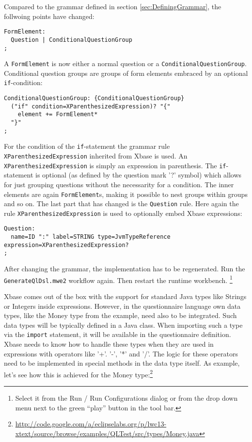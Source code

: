Compared to the grammar defined in section \ref{sec:DefiningGrammar}, the follwoing points have changed:


\begin{lstlisting}[language=Xtext]
FormElement:
  Question | ConditionalQuestionGroup
;
\end{lstlisting}

A \texttt{FormElement} is now either a normal question or a \texttt{ConditionalQuestionGroup}. Conditional
question groups are groups of form elements embraced by an optional \texttt{if}-condition:

\begin{lstlisting}[language=Xtext]
ConditionalQuestionGroup: {ConditionalQuestionGroup}
  ("if" condition=XParenthesizedExpression)? "{"
    element += FormElement*
  "}"
;
\end{lstlisting}

For the condition of the \texttt{if}-statement the grammar rule \texttt{XParenthesizedExpression} 
inherited from Xbase is used. An \texttt{XParenthesizedExpression} is simply an expression in parenthesis.
The \texttt{if}-statement is optional (as defined by the question mark '?' symbol) which allows for just
grouping questions without the necessarity for a condition. The inner elements are again \texttt{FormElement}s,
making it possible to nest groups within groups and so on. The last part that has changed is the \texttt{Question}
rule. Here again the rule \texttt{XParenthesizedExpression} is used to optionally embed Xbase expressions:

\begin{lstlisting}[language=Xtext]
Question:
  name=ID ":" label=STRING type=JvmTypeReference expression=XParenthesizedExpression?
;
\end{lstlisting}

After changing the grammar, the implementation has to be regenerated. Run the
\newline\texttt{GenerateQlDsl.mwe2} workflow again. Then restart the runtime
workbench.
\footnote{Select it from the Run / Run Configurations dialog or from the drop
down menu next to the green ``play'' button in the tool bar.}

Xbase comes out of the box with the support for standard Java types like Strings or Integers inside expressions.
However, in the questionnaire language own data types, like the Money type from the example, need also to be
integrated. Such data types will be typically defined in a Java class. When importing such a type via the \texttt{import}
statement, it will be available in the questionnaire definition. Xbase needs to know how to handle
these types when they are used in expressions with operators like '+'. '-', '*' and '/'. The logic for these
operators need to be implemented in special methods in the data type itself. As example, let's see how this
is achieved for the Money
type:\footnote{\url{http://code.google.com/a/eclipselabs.org/p/lwc13-xtext/source/browse/examples/QLTest/src/types/Money.java}}


